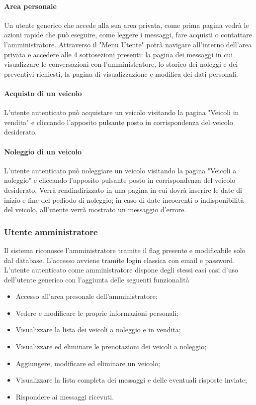         \paragraph{Area personale} Un utente generico che accede alla sua area privata, come prima pagina vedrà le azioni rapide che può eseguire, come leggere i messaggi, fare acquisti o contattare l'amministratore. Attraverso il "Menu Utente" potrà navigare all'interno dell'area privata e accedere alle 4 sottosezioni presenti: la pagina dei messaggi in cui visualizzare le conversazioni con l'amministratore, lo storico dei noleggi e dei preventivi richiesti, la pagina di visualizzazione e  modifica dei dati personali.

        \paragraph{Acquisto di un veicolo}
        L'utente autenticato può acquistare un veicolo visitando la pagina "Veicoli in vendita" e cliccando l'apposito pulsante posto in corrispondenza del veicolo desiderato.

        \paragraph{Noleggio di un veicolo}
        L'utente autenticato può noleggiare un veicolo visitando la pagina "Veicoli a noleggio" e cliccando l'apposito pulsante posto in corrispondenza del veicolo desiderato. Verrà rendindirizzato in una pagina in cui dovrà inserire le date di inizio e fine del pediodo di noleggio; in caso di date incoerenti o indisponibilità del veicolo, all'utente verrà mostrato un messaggio d'errore.

        \subsubsection{Utente amministratore}
        Il sistema riconosce l’amministratore tramite il flag presente e modificabile solo dal database.
        L’accesso avviene tramite login classica con email e password.
        L’utente autenticato come amministratore dispone degli stessi casi casi d’uso dell'utente generico con l'aggiunta delle seguenti funzionalità
        \begin{itemize}
            \item Accesso all'area presonale dell'amministratore;
            \item Vedere e modificare le proprie informazioni personali;
            \item Visualizzare la lista dei veicoli a noleggio e in vendita;
            \item Visualizzare ed eliminare le prenotazioni dei veicoli a noleggio;
            \item Aggiungere, modificare ed eliminare un veicolo;
            \item Visualizzare la lista completa dei messaggi e delle eventuali risposte inviate;
            \item Rispondere ai messaggi ricevuti.
        \end{itemize}

